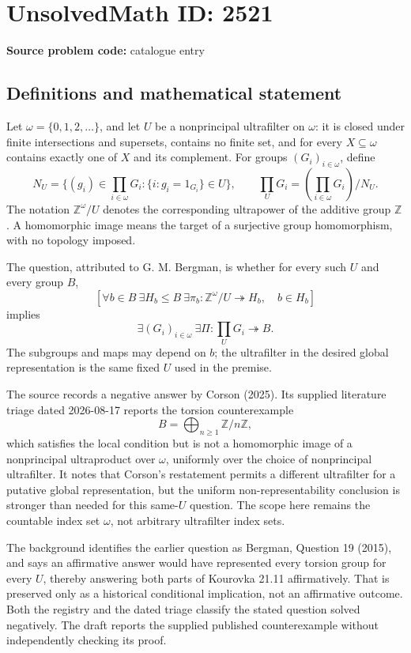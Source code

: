 \documentclass[11pt]{article}
\newcommand{\Z}{\mathbb{Z}}
\begin{document}
\section*{UnsolvedMath ID: 2521}
\textbf{Source problem code:} catalogue entry
\subsection{Definitions and mathematical statement}
Let \(\omega=\{0,1,2,\ldots\}\), and let \(U\) be a nonprincipal ultrafilter on \(\omega\): it is closed under finite intersections and supersets, contains no finite set, and for every \(X\subseteq\omega\) contains exactly one of \(X\) and its complement. For groups \((G_i)_{i\in\omega}\), define
\[
N_U=\{(g_i)\in\prod_{i\in\omega}G_i:\{i:g_i=1_{G_i}\}\in U\},
\qquad
\prod_U G_i=\left(\prod_{i\in\omega}G_i\right)/N_U.
\]
The notation \(\Z^\omega/U\) denotes the corresponding ultrapower of the additive group \(\Z\). A homomorphic image means the target of a surjective group homomorphism, with no topology imposed.

The question, attributed to G. M. Bergman, is whether for every such \(U\) and every group \(B\),
\[
\left[\forall b\in B\ \exists H_b\leq B\ \exists\pi_b:\Z^\omega/U\twoheadrightarrow H_b,\quad b\in H_b\right]
\]
implies
\[
\exists(G_i)_{i\in\omega}\ \exists\Pi:\prod_U G_i\twoheadrightarrow B.
\]
The subgroups and maps may depend on \(b\); the ultrafilter in the desired global representation is the same fixed \(U\) used in the premise.

The source records a negative answer by Corson (2025). Its supplied literature triage dated 2026-08-17 reports the torsion counterexample
\[
B=\bigoplus_{n\geq1}\Z/n\Z,
\]
which satisfies the local condition but is not a homomorphic image of a nonprincipal ultraproduct over \(\omega\), uniformly over the choice of nonprincipal ultrafilter. It notes that Corson's restatement permits a different ultrafilter for a putative global representation, but the uniform non-representability conclusion is stronger than needed for this same-\(U\) question. The scope here remains the countable index set \(\omega\), not arbitrary ultrafilter index sets.

The background identifies the earlier question as Bergman, Question 19 (2015), and says an affirmative answer would have represented every torsion group for every \(U\), thereby answering both parts of Kourovka 21.11 affirmatively. That is preserved only as a historical conditional implication, not an affirmative outcome. Both the registry and the dated triage classify the stated question solved negatively. The draft reports the supplied published counterexample without independently checking its proof.
\end{document}
